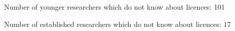 Number of younger researchers which do not know about licences: 101

Number of established researchers which do not know about licences: 17

